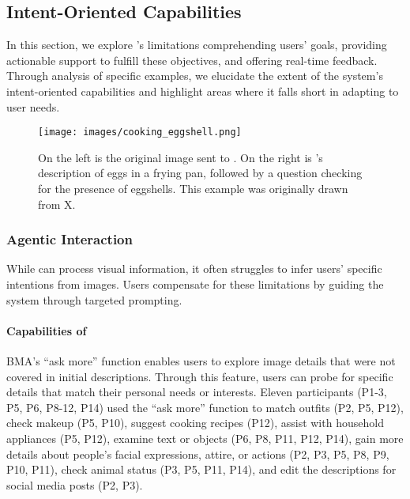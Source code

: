\subsection{Intent-Oriented Capabilities}

In this section, we explore \sbma's limitations  comprehending users' goals, providing actionable support to fulfill these objectives, and offering real-time feedback. 
% 
Through analysis of specific examples, we elucidate the extent of the system's intent-oriented capabilities and highlight areas where it falls short in adapting to user needs. 



\begin{figure}[t!]
\centering
\texttt{[image: images/cooking\_eggshell.png]}
\caption{On the left is the original image sent to \bma. On the right is \bma's description of eggs in a frying pan, followed by a question checking for the presence of eggshells. This example was originally drawn from X.}
\label{eggshells}
\end{figure}


\subsubsection{Agentic Interaction}
\label{agentic_interaction}

While \bma{} can process visual information, it often struggles to infer users' specific intentions from images. Users compensate for these limitations by guiding the system through targeted prompting. 


\paragraph{Capabilities of \bma}



BMA's ``ask more'' function enables users to explore image details that were not covered in initial descriptions. Through this feature, users can probe for specific details that match their personal needs or interests.
% 
Eleven participants (P1-3, P5, P6, P8-12, P14) used the ``ask more'' function to 
match outfits (P2, P5, P12),
check makeup (P5, P10), 
suggest cooking recipes (P12), 
assist with household appliances (P5, P12), 
examine text or objects (P6, P8, P11, P12, P14),
gain more details about people's facial expressions, attire, or actions (P2, P3, P5, P8, P9, P10, P11), 
check animal status (P3, P5, P11, P14), 
and edit the descriptions for social media posts (P2, P3). 



